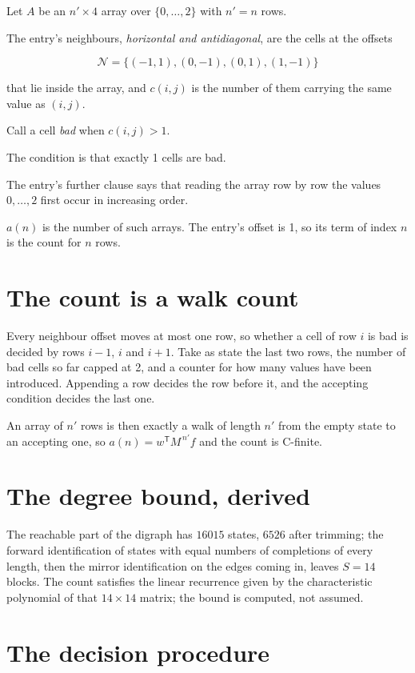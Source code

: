 \documentclass[11pt]{article}
\theoremstyle{definition}
\begin{document}
Let $A$ be an $n' \times 4$ array over $\{0,\dots,2\}$ with $n' = n$ rows.

The entry's neighbours, {\itshape horizontal and antidiagonal}, are the cells at the offsets

\[\mathcal{N} = \{(-1,1), (0,-1), (0,1), (1,-1)\}\]

that lie inside the array, and $c(i,j)$ is the number of them carrying the same value as $(i,j)$.

Call a cell {\itshape bad} when $c(i,j) > 1$.

The condition is that exactly 1 cells are bad.

The entry's further clause says that reading the array row by row the values $0,\dots,2$ first occur in increasing order.

$a(n)$ is the number of such arrays. The entry's offset is 1, so its term of index $n$ is the count for $n$ rows.

\section{The count is a walk count}

Every neighbour offset moves at most one row, so whether a cell of row $i$ is bad is decided by rows $i-1$, $i$ and $i+1$. Take as state the last two rows, the number of bad cells so far capped at 2, and a counter for how many values have been introduced. Appending a row decides the row before it, and the accepting condition decides the last one.

An array of $n'$ rows is then exactly a walk of length $n'$ from the empty state to an accepting one, so $a(n) = w^{\mathsf T}M^{\,n'}f$ and the count is C-finite.

\section{The degree bound, derived}

The reachable part of the digraph has $16015$ states, $6526$ after trimming; the forward identification of states with equal numbers of completions of every length, then the mirror identification on the edges coming in, leaves $S = 14$ blocks. The count satisfies the linear recurrence given by the characteristic polynomial of that $14\times14$ matrix; the bound is computed, not assumed.

\section{The decision procedure}
\end{document}
